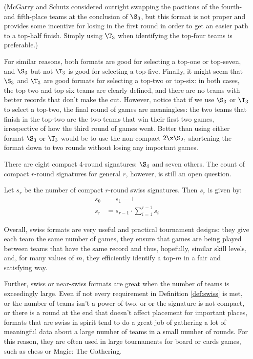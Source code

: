 {(McGarry and Schutz \cite{four_five_swap} considered outright swapping the positions of the fourth- and fifth-place teams at the conclusion of $\S_3$, but this format is not proper and provides some incentive for losing in the first round in order to get an easier path to a top-half finish. Simply using $\T_3$ when identifying the top-four teams is preferable.)

For similar reasons, both formats are good for selecting a top-one or top-seven, and $\S_3$ but not $\T_3$ is good for selecting a top-five. Finally, it might seem that $\S_3$ and $\T_3$ are good formats for selecting a top-two or top-six: in both cases, the top two and top six teams are clearly defined, and there are no teams with better records that don't make the cut. However, notice that if we use $\S_3$ or $\T_3$ to select a top-two, the final round of games are meaningless: the two teams that finish in the top-two are the two teams that win their first two games, irrespective of how the third round of games went. Better than using either format $\S_3$ or $\T_3$ would be to use the non-compact $2\x\S_2,$ shortening the format down to two rounds without losing any important games.

There are eight compact 4-round signatures: $\S_4$ and seven others. The count of compact $r$-round signatures for general $r$, however, is still an open question.

\begin{conj}{}{}
    Let $s_r$ be the number of compact $r$-round swiss signatures. Then $s_r$ is given by:
    \begin{align*}
        s_0 &= s_ 1 = 1\\
        s_r &= s_{r-1} \cdot \sum_{i=1}^{r-1}s_i
    \end{align*}
\end{conj}

Overall, swiss formats are very useful and practical tournament designs: they give each team the same number of games, they ensure that games are being played between teams that have the same record and thus, hopefully, similar skill levels, and, for many values of $m$, they efficiently identify a top-$m$ in a fair and satisfying way.

Further, swiss or near-swiss formats are great when the number of teams is exceedingly large. Even if not every requirement in Definition \ref{def:swiss} is met, or the number of teams isn't a power of two, or or the signature is not compact, or there is a round at the end that doesn't affect placement for important places, formats that are swiss in spirit tend to do a great job of gathering a lot of meaningful data about a large number of teams in a small number of rounds. For this reason, they are often used in large tournaments for board or cards games, such as chess or Magic: The Gathering. %
}